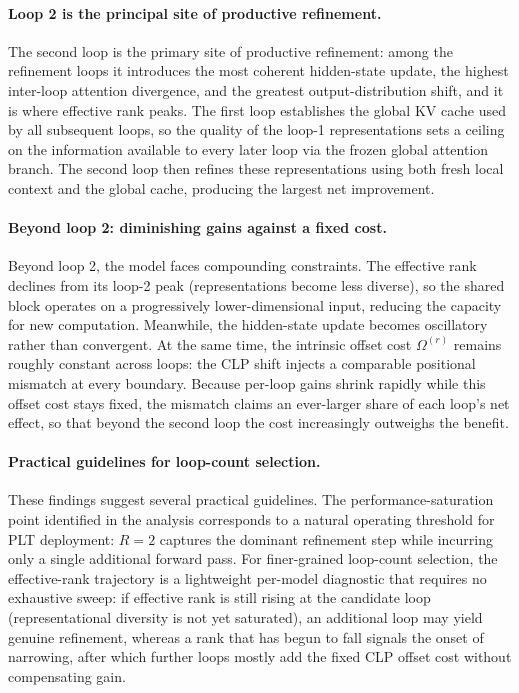 \documentclass{llmxive}
\providecommand{\loopcount}{R}
\begin{document}
\paragraph{Loop 2 is the principal site of productive refinement.}
The second loop is the primary site of productive refinement: among the
refinement loops it introduces the most coherent hidden-state update, the
highest inter-loop attention divergence, and the greatest output-distribution
shift, and it is where effective rank peaks.
The first loop establishes the global KV cache used by all subsequent loops,
so the quality of the loop-1 representations sets a ceiling on the
information available to every later loop via the frozen global attention
branch.
The second loop then refines these representations using both fresh local
context and the global cache, producing the largest net improvement.

\paragraph{Beyond loop 2: diminishing gains against a fixed cost.}
Beyond loop 2, the model faces compounding constraints.
The effective rank declines from its loop-2 peak (representations become less
diverse), so the shared block operates on a progressively lower-dimensional
input, reducing the capacity for new computation. Meanwhile, the hidden-state
update becomes oscillatory rather than convergent.
At the same time, the intrinsic offset cost $\Omega^{(r)}$ remains roughly
constant across loops: the CLP shift injects a comparable positional mismatch
at every boundary.
Because per-loop gains shrink rapidly while this offset cost stays fixed, the
mismatch claims an ever-larger share of each loop's net effect, so that beyond
the second loop the cost increasingly outweighs the benefit.

\paragraph{Practical guidelines for loop-count selection.}
These findings suggest several practical guidelines.
The performance-saturation point identified in the analysis corresponds to
a natural operating threshold for PLT deployment: $\loopcount = 2$ captures the
dominant refinement step while incurring only a single additional forward pass.
For finer-grained loop-count selection, the effective-rank trajectory is a
lightweight per-model diagnostic that requires no exhaustive sweep: if effective
rank is still rising at the candidate loop (representational diversity is not
yet saturated), an additional loop may yield genuine refinement, whereas a rank
that has begun to fall signals the onset of narrowing, after which further loops
mostly add the fixed CLP offset cost without compensating gain.
\end{document}

